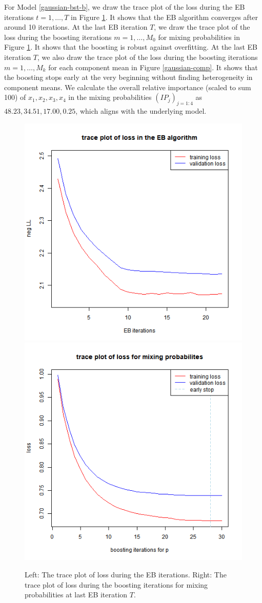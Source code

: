 \documentclass[11pt]{article}
\numberwithin{equation}{section}
\begin{document}
For Model \eqref{gaussian-bst-b}, we draw the trace plot of the loss during the EB iterations $t=1,\ldots,T$ in Figure \ref{gaussian-trace}.
It shows that the EB algorithm converges after around 10 iterations. 
At the last EB iteration $T$, we draw the trace plot of the loss during the boosting iterations $m=1,\ldots,M_0$ for mixing probabilities in Figure \ref{gaussian-trace}.
It shows that the boosting is robust against overfitting.
At the last EB iteration $T$, we also draw the trace plot of the loss during the boosting iterations $m=1,\ldots,M_k$ for each component mean in Figure \ref{gaussian-comp}.
It shows that the boosting stops early at the very beginning  without finding heterogeneity in component means. 
We calculate the overall relative importance (scaled to sum 100) of $x_1,x_2,x_3,x_4$ in the mixing probabilities $(IP_j)_{j=1:4}$ as $48.23,34.51,17.00,0.25$, which aligns with the underlying model.

\begin{figure}[htp!]
		\centering
	\includegraphics[width=0.4\linewidth]{../plots/three_gaussians/loss-bst-both}
		\includegraphics[width=0.4\linewidth]{../plots/three_gaussians/loss-bst-both-p}
\caption{Left: The trace plot of loss during the EB iterations. Right: The trace plot of loss during the boosting iterations for mixing probabilities at last EB iteration $T$.}\label{gaussian-trace}
\end{figure} 
\end{document}
